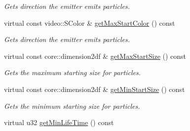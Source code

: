 \begin{DoxyCompactItemize}
\begin{DoxyCompactList}\small\item\em Gets direction the emitter emits particles. \end{DoxyCompactList}\item 
\hypertarget{classirr_1_1scene_1_1_c_particle_cylinder_emitter_a74e8e9f82af5af073274100e89662653}{virtual const video\-::\-S\-Color \& \hyperlink{classirr_1_1scene_1_1_c_particle_cylinder_emitter_a74e8e9f82af5af073274100e89662653}{get\-Max\-Start\-Color} () const }\label{classirr_1_1scene_1_1_c_particle_cylinder_emitter_a74e8e9f82af5af073274100e89662653}

\begin{DoxyCompactList}\small\item\em Gets direction the emitter emits particles. \end{DoxyCompactList}\item 
\hypertarget{classirr_1_1scene_1_1_c_particle_cylinder_emitter_a49d28a0b2a91173b8ad05fe3fb520023}{virtual const core\-::dimension2df \& \hyperlink{classirr_1_1scene_1_1_c_particle_cylinder_emitter_a49d28a0b2a91173b8ad05fe3fb520023}{get\-Max\-Start\-Size} () const }\label{classirr_1_1scene_1_1_c_particle_cylinder_emitter_a49d28a0b2a91173b8ad05fe3fb520023}

\begin{DoxyCompactList}\small\item\em Gets the maximum starting size for particles. \end{DoxyCompactList}\item 
\hypertarget{classirr_1_1scene_1_1_c_particle_cylinder_emitter_a96082376dc70b13892df234f6b8887dc}{virtual const core\-::dimension2df \& \hyperlink{classirr_1_1scene_1_1_c_particle_cylinder_emitter_a96082376dc70b13892df234f6b8887dc}{get\-Min\-Start\-Size} () const }\label{classirr_1_1scene_1_1_c_particle_cylinder_emitter_a96082376dc70b13892df234f6b8887dc}

\begin{DoxyCompactList}\small\item\em Gets the minimum starting size for particles. \end{DoxyCompactList}\item 
\hypertarget{classirr_1_1scene_1_1_c_particle_cylinder_emitter_a3b8f9fa5bb6cd8337446213aeaa6da77}{virtual u32 \hyperlink{classirr_1_1scene_1_1_c_particle_cylinder_emitter_a3b8f9fa5bb6cd8337446213aeaa6da77}{get\-Min\-Life\-Time} () const }\label{classirr_1_1scene_1_1_c_particle_cylinder_emitter_a3b8f9fa5bb6cd8337446213aeaa6da77}


\end{DoxyCompactItemize}
